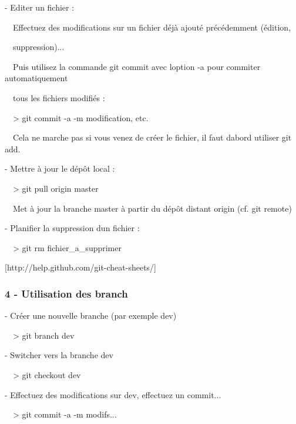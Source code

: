 \documentclass{article}
\begin{document}
\bigskip

{}- Editer un fichier :

\ \ Effectuez des modifications sur un fichier déjà ajouté précédemment
(édition,

\ \ suppression)...

\ \ Puis utilisez la commande git commit avec l{\textquotesingle}option
-a pour commiter automatiquement

\ \ tous les fichiers modifiés :

\ \ {\textgreater} git commit -a -m {\textquotedbl}modification,
etc.{\textquotedbl}


\bigskip

\ \ Cela ne marche pas si vous venez de créer le fichier, il faut
d{\textquotesingle}abord utiliser git add.


\bigskip


\bigskip

{}- Mettre à jour le dépôt local :

\ \ {\textgreater} git pull origin master

\ \ Met à jour la branche master à partir du dépôt distant origin (cf.
git remote)


\bigskip


\bigskip

{}- Planifier la suppression d{\textquotesingle}un fichier :

\ \ {\textgreater} git rm fichier\_a\_supprimer


\bigskip

[http://help.github.com/git-cheat-sheets/]

\subsubsection[4 {}- Utilisation des branch]{4 - Utilisation des branch}

\bigskip

 {}- Créer une nouvelle branche (par exemple
{\textquotedbl}dev{\textquotedbl})

\ \ {\textgreater} git branch dev


\bigskip

 {}- Switcher vers la branche {\textquotedbl}dev{\textquotedbl}

\ \ {\textgreater} git checkout dev


\bigskip

 {}- Effectuez des modifications sur {\textquotedbl}dev{\textquotedbl},
effectuez un commit...

\ \ {\textgreater} git commit -a -m
{\textquotedbl}modifs...{\textquotedbl}
\end{document}
